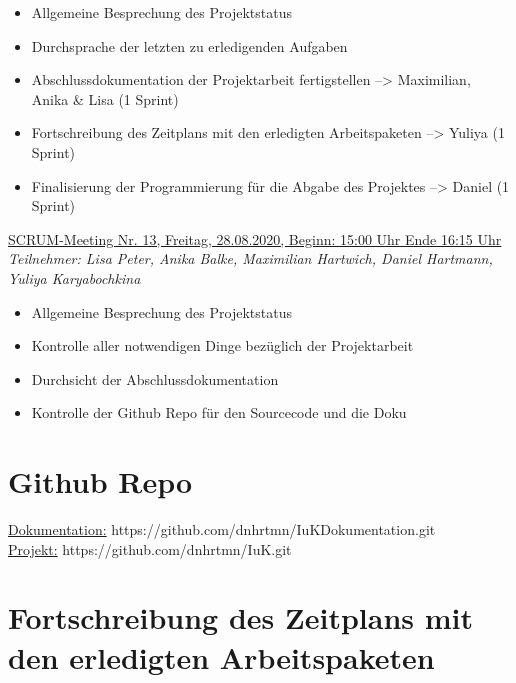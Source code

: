 \documentclass[a4paper,report,headsepline]{scrreprt}
\begin{document}
\begin{itemize}
\item Allgemeine Besprechung des Projektstatus 
\item Durchsprache der letzten zu erledigenden Aufgaben 
\item Abschlussdokumentation der Projektarbeit fertigstellen --> Maximilian, Anika \& Lisa (1 Sprint) 
\item Fortschreibung des Zeitplans mit den erledigten Arbeitspaketen --> Yuliya (1 Sprint) 
\item Finalisierung der Programmierung für die Abgabe des Projektes --> Daniel (1 Sprint) 
\end{itemize}
\underline{{\large SCRUM-Meeting Nr. 13, Freitag, 28.08.2020, Beginn: 15:00 Uhr Ende 16:15 Uhr}} \\
\textit{Teilnehmer: Lisa Peter, Anika Balke, Maximilian Hartwich, Daniel Hartmann, Yuliya Karyabochkina}

\begin{itemize}
\item Allgemeine Besprechung des Projektstatus 
\item Kontrolle aller notwendigen Dinge bezüglich der Projektarbeit 
\item Durchsicht der Abschlussdokumentation 
\item Kontrolle der Github Repo für den Sourcecode und die Doku 
\end{itemize}
     
\chapter{Github Repo}
\underline{Dokumentation:} https://github.com/dnhrtmn/IuKDokumentation.git \\
\underline{Projekt:} https://github.com/dnhrtmn/IuK.git
\chapter{Fortschreibung des Zeitplans mit den erledigten Arbeitspaketen}
\end{document}
